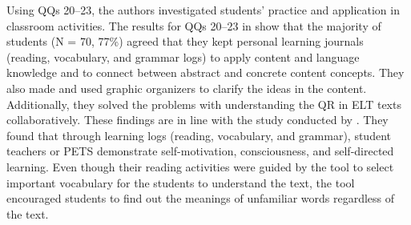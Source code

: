 \documentclass[english]{textolivre}
\begin{document}
Using QQs 20–23, the authors investigated students’ practice and application in classroom activities. The results for QQs 20–23 in  show that the majority of students (N = 70, 77\%) agreed that they kept personal learning journals (reading, vocabulary, and grammar logs) to apply content and language knowledge and to connect between abstract and concrete content concepts. They also made and used graphic organizers to clarify the ideas in the content. Additionally, they solved the problems with understanding the QR in ELT texts collaboratively. These findings are in line with the study conducted by \textcite{yanto_implementing_2020}. They found that through learning logs (reading, vocabulary, and grammar), student teachers or PETS demonstrate self-motivation, consciousness, and self-directed learning. Even though their reading activities were guided by the tool to select important vocabulary for the students to understand the text, the tool encouraged students to find out the meanings of unfamiliar words regardless of the text.
\end{document}
